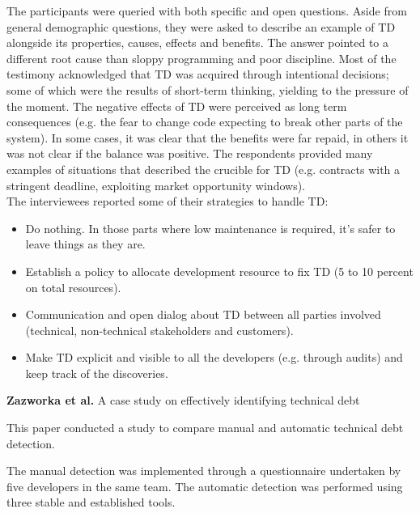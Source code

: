 The participants were queried with both specific and open questions. Aside from general demographic questions, they were asked to describe an example of TD alongside its properties, causes, effects and benefits. 
The answer pointed to a different root cause than sloppy programming and poor discipline. Most of the testimony acknowledged that TD was acquired through intentional decisions; some of which were the results of short-term thinking, yielding to the pressure of the moment.
The negative effects of TD were perceived as long term consequences (e.g. the fear to change code expecting to break other parts of the system). 
In some cases, it was clear that the benefits were far repaid, in others it was not clear if the balance was positive.
The respondents provided many examples of situations that described the crucible for TD (e.g. contracts with a stringent deadline, exploiting market opportunity windows). 
\\
The interviewees reported some of their strategies to handle TD:
\begin{itemize}
    \item Do nothing. In those parts where low maintenance is required, it's safer to leave things as they are.
    \item Establish a policy to allocate development resource to fix TD (5 to 10 percent on total resources).
    \item Communication and open dialog about TD between all parties involved (technical, non-technical stakeholders and customers).
    \item Make TD explicit and visible to all the developers (e.g. through audits) and keep track of the discoveries.
\end{itemize}
\textbf{Zazworka et al.} \cite{zazworka2013case} A case study on effectively identifying technical debt

This paper conducted a study to compare manual and automatic technical debt detection. 

The manual detection was implemented through a questionnaire undertaken by five developers in the same team. The automatic detection was performed using three stable and established tools. 

